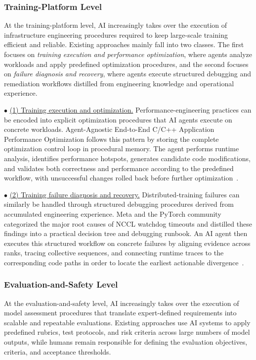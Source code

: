 \subsubsection{Training-Platform Level}
At the training-platform level, AI increasingly takes over the execution of infrastructure engineering procedures required to keep large-scale training efficient and reliable. Existing approaches mainly fall into two classes. The first focuses on \emph{training execution and performance optimization}, where agents analyze workloads and apply predefined optimization procedures, and the second focuses on \emph{failure diagnosis and recovery}, where agents execute structured debugging and remediation workflows distilled from engineering knowledge and operational experience.

\noindent$\bullet$ \underline{(1) {Training execution and optimization.}} 
Performance-engineering practices can be encoded into explicit optimization procedures that AI agents execute on concrete workloads. Agent-Agnostic End-to-End C/C++ Application Performance Optimization follows this pattern by storing the complete optimization control loop in procedural memory. The agent performs runtime analysis, identifies performance hotspots, generates candidate code modifications, and validates both correctness and performance according to the predefined workflow, with unsuccessful changes rolled back before further optimization~\cite{lu2026agentagnostic}.

\noindent$\bullet$ \underline{(2) {Training failure diagnosis and recovery.}} 
Distributed-training failures can similarly be handled through structured debugging procedures derived from accumulated engineering experience. Meta and the PyTorch community categorized the major root causes of NCCL watchdog timeouts and distilled these findings into a practical decision tree and debugging runbook. An AI agent then executes this structured workflow on concrete failures by aligning evidence across ranks, tracing collective sequences, and connecting runtime traces to the corresponding code paths in order to locate the earliest actionable divergence~\cite{meta_nccl_agentic_debugging}.

\subsubsection{Evaluation-and-Safety Level}
At the evaluation-and-safety level, AI increasingly takes over the execution of model assessment procedures that translate expert-defined requirements into scalable and repeatable evaluations. Existing approaches use AI systems to apply predefined rubrics, test protocols, and risk criteria across large numbers of model outputs, while humans remain responsible for defining the evaluation objectives, criteria, and acceptance thresholds.

